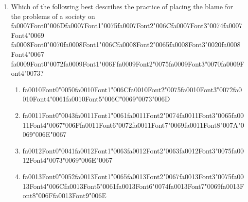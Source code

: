 \documentclass[12pt]{article}
\begin{document}
\begin{enumerate}[label=\arabic*.]
\begin{enumerate}[label=(\alph*)]
    \item a centrally planned {\csname fa0006Font0\endcsname\char"0073}{\csname fa0006Font1\endcsname\char"0079}{\csname fa0006Font2\endcsname\char"0073}{\csname fa0006Font3\endcsname\char"0074}{\csname fa0006Font4\endcsname\char"0065}{\csname fa0006Font5\endcsname\char"006D}
\end{enumerate}
\item Which of the following best describes the practice of placing the blame for the problems of a society on {\csname fa0007Font0\endcsname\char"006D}{\csname fa0007Font1\endcsname\char"0075}{\csname fa0007Font2\endcsname\char"006C}{\csname fa0007Font3\endcsname\char"0074}{\csname fa0007Font4\endcsname\char"0069} {\csname fa0008Font0\endcsname\char"0070}{\csname fa0008Font1\endcsname\char"006C}{\csname fa0008Font2\endcsname\char"0065}{\csname fa0008Font3\endcsname\char"0020}{\csname fa0008Font4\endcsname\char"0067} {\csname fa0009Font0\endcsname\char"0072}{\csname fa0009Font1\endcsname\char"006F}{\csname fa0009Font2\endcsname\char"0075}{\csname fa0009Font3\endcsname\char"0070}{\csname fa0009Font4\endcsname\char"0073}?
\begin{enumerate}[label=(\alph*)]
    \item {\csname fa0010Font0\endcsname\char"0050}{\csname fa0010Font1\endcsname\char"006C}{\csname fa0010Font2\endcsname\char"0075}{\csname fa0010Font3\endcsname\char"0072}{\csname fa0010Font4\endcsname\char"0061}{\csname fa0010Font5\endcsname\char"006C}{\char"0069}{\char"0073}{\char"006D}
    \item {\csname fa0011Font0\endcsname\char"0043}{\csname fa0011Font1\endcsname\char"0061}{\csname fa0011Font2\endcsname\char"0074}{\csname fa0011Font3\endcsname\char"0065}{\csname fa0011Font4\endcsname\char"0067}{\char"006F}{\csname fa0011Font6\endcsname\char"0072}{\csname fa0011Font7\endcsname\char"0069}{\csname fa0011Font8\endcsname\char"007A}{\char"0069}{\char"006E}{\char"0067}
    \item {\csname fa0012Font0\endcsname\char"0041}{\csname fa0012Font1\endcsname\char"0063}{\csname fa0012Font2\endcsname\char"0063}{\csname fa0012Font3\endcsname\char"0075}{\csname fa0012Font4\endcsname\char"0073}{\char"0069}{\char"006E}{\char"0067}
    \item {\csname fa0013Font0\endcsname\char"0052}{\csname fa0013Font1\endcsname\char"0065}{\csname fa0013Font2\endcsname\char"0067}{\csname fa0013Font3\endcsname\char"0075}{\csname fa0013Font4\endcsname\char"006C}{\csname fa0013Font5\endcsname\char"0061}{\csname fa0013Font6\endcsname\char"0074}{\csname fa0013Font7\endcsname\char"0069}{\csname fa0013Font8\endcsname\char"006F}{\csname fa0013Font9\endcsname\char"006E}
\end{enumerate}
\end{enumerate}
\end{document}
